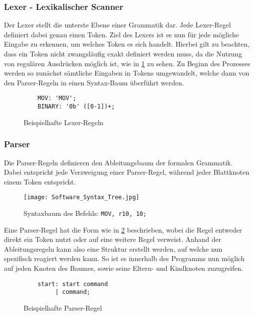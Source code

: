\documentclass[paper=a4,fontsize=11pt,twocolumn]{scrreprt}
\begin{document}
\subsubsection{Lexer - Lexikalischer Scanner}
Der Lexer stellt die unterste Ebene einer Grammatik dar.
Jede Lexer-Regel definiert dabei genau einen Token.
Ziel des Lexers ist es nun für jede mögliche Eingabe zu erkennen, um welches Token es sich handelt.
Hierbei gilt zu beachten, dass ein Token nicht zwangsläufig exakt definiert werden muss, da die Nutzung von regulären Ausdrücken möglich ist, wie in \ref{fig:Lexer_Commands} zu sehen.
Zu Beginn des Prozesses werden so zunächst sämtliche Eingaben in Tokens umgewandelt, welche dann von den Parser-Regeln in einen Syntax-Baum überführt werden.

\begin{figure}[ht]
    \centering
    \begin{lstlisting}
    MOV: 'MOV';
    BINARY: '0b' ([0-1])+;
    \end{lstlisting}
    \caption{Beispielhafte Lexer-Regeln}
    \label{fig:Lexer_Commands}
\end{figure}

\subsubsection{Parser}
Die Parser-Regeln definieren den Ableitungsbaum der formalen Grammatik.
Dabei entspricht jede Verzweigung einer Parser-Regel, während jeder Blattknoten einem Token entspricht.

\begin{figure}[ht]
\centering
\texttt{[image: Software\_Syntax\_Tree.jpg]}
\caption{Syntaxbaum des Befehls: \texttt{MOV, r10, 10;}}
\end{figure}

Eine Parser-Regel hat die Form wie in \ref{fig:Parser_Commands} beschrieben,
wobei die Regel entweder direkt ein Token nutzt oder auf eine weitere Regel verweist.
Anhand der Ableitungsregeln kann also eine Struktur erstellt werden, auf welche nun spezifisch reagiert werden kann.
So ist es innerhalb des Programms nun möglich auf jeden Knoten des Baumes, sowie seine Eltern- und Kindknoten zuzugreifen.

\begin{figure}[ht]
    \centering
    \begin{lstlisting}
    start: start command 
         | command;
    \end{lstlisting}
    \caption{Beispielhafte Parser-Regel}
    \label{fig:Parser_Commands}
\end{figure}
\end{document}
